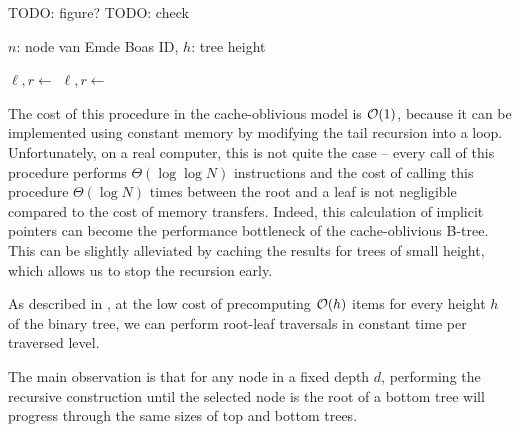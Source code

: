 TODO: figure?
TODO: check
\begin{algorithmic}
 {$n$: node van Emde Boas ID, $h$: tree height}
	  \EndIf

	 
	 

		\State $\ell, r \gets$ 
			\State {}
		\Else{}
			\State {}
		\EndIf
	\Else
		\State $\ell,r\gets$ 
			\State {}
		\Else
			 
			\State {}
		\EndIf
	\EndIf
\EndFunction
\end{algorithmic}

The cost of this procedure in the cache-oblivious model is $\mathcal{O}(1)$, because
it can be implemented using constant memory by modifying the tail recursion into
a loop. Unfortunately, on a real computer, this is not quite the case --
every call of this procedure performs $\Theta(\log\log N)$ instructions and
the cost of calling this procedure $\Theta(\log N)$ times between the root
and a leaf is not negligible compared to the cost of memory transfers.
Indeed, this calculation of implicit pointers can become the performance
bottleneck of the cache-oblivious B-tree.
This can be slightly alleviated by caching the results for trees of small
height, which allows us to stop the recursion early.

As described in \cite{brodal01}, at the low cost of precomputing $\mathcal{O}(h)$
items for every height $h$ of the binary tree, we can perform root-leaf
traversals in constant time per traversed level.

The main observation is that for any node in a fixed depth $d$,
performing the recursive construction until the selected node is the root
of a bottom tree will progress through the same sizes of top and bottom trees.


